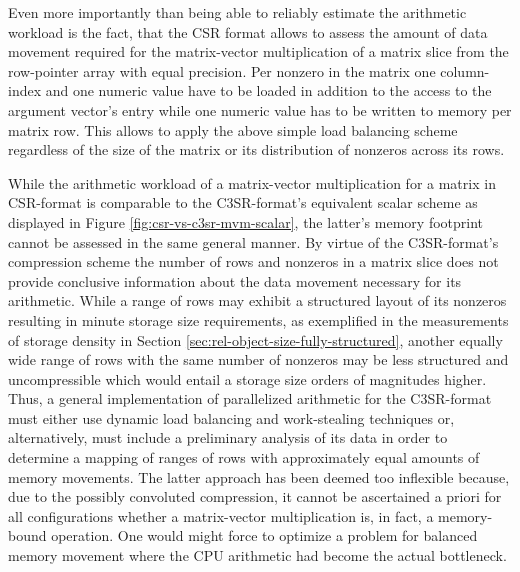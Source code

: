     Even more importantly than being able to reliably estimate the arithmetic workload is the fact, that the CSR format
    allows to assess the amount of data movement required for the matrix-vector multiplication of a matrix slice from
    the row-pointer array with equal precision. Per nonzero in the matrix one column-index and one numeric value have to
    be loaded in addition to the access to the argument vector's entry while one numeric value has to be written to memory
    per matrix row. This allows to apply the above simple load balancing scheme regardless of the size of the matrix or
    its distribution of nonzeros across its rows.

    While the arithmetic workload of a matrix-vector multiplication for a matrix in CSR-format is comparable to the
    C3SR-format's equivalent scalar scheme as displayed in Figure \ref{fig:csr-vs-c3sr-mvm-scalar}, the latter's memory
    footprint cannot be assessed in the same general manner. By virtue of the C3SR-format's compression scheme the
    number of rows and nonzeros in a matrix slice does not provide conclusive information about the data movement
    necessary for its arithmetic. While a range of rows may exhibit a structured layout of its nonzeros resulting in
    minute storage size requirements, as exemplified in the measurements of storage density in Section
    \ref{sec:rel-object-size-fully-structured}, another equally wide range of rows with the same number of nonzeros may
    be less structured and uncompressible which would entail a storage size orders of magnitudes higher. Thus, a general
    implementation of parallelized arithmetic for the C3SR-format must either use dynamic load balancing and
    work-stealing techniques or, alternatively, must include a preliminary analysis of its data in order to determine a
    mapping of ranges of rows with approximately equal amounts of memory movements. The latter approach has been deemed
    too inflexible because, due to the possibly convoluted compression, it cannot be ascertained a priori for all
    configurations whether a matrix-vector multiplication is, in fact, a memory-bound operation. One would might force
    to optimize a problem for balanced memory movement where the CPU arithmetic had become the actual bottleneck.

